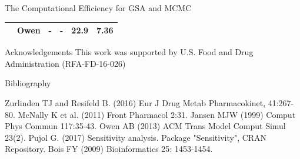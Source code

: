 \documentclass[xcolor=table]{beamer}
\begin{document}
\begin{frame}[t]
\begin{columns}[t]
\begin{column}{0.22\paperwidth}
\begin{block}{The Computational Efficiency for GSA and MCMC}
\begin{table}
\begin{adjustbox}{max width=\textwidth}
\begin{threeparttable}
\begin{tabular}{llcccc}
	    & Owen & - & - & 22.9 & 7.36 \\
    \hline   
  \end{tabular}
   \end{threeparttable} 
   \end{adjustbox}
\end{table}
\end{block}
%
\begin{block}{Acknowledgements}
\small This work was supported by U.S. Food and Drug Administration (RFA-FD-16-026) \\
\end{block}
%
\begin{alertblock}{Bibliography}
\begin{thebibliography}{9}
{\footnotesize {}
Zurlinden TJ and Resifeld B. (2016) Eur J Drug Metab Pharmacokinet, 41:267-80.}
{\footnotesize {}
McNally K et al. (2011) Front Pharmacol 2:31.}
{\footnotesize {}
Jansen MJW (1999) Comput Phys Commun 117:35-43.}
{\footnotesize {}
Owen AB (2013) ACM Trans Model Comput Simul 23(2).}
{\footnotesize {}
Pujol G. (2017) Sensitivity analysis. Package "Sensitivity", CRAN Repository.}
{\footnotesize {}
Bois FY (2009) Bioinformatics 25: 1453-1454.}
\end{thebibliography}
\end{alertblock}


\end{column} %

\end{columns} %

\end{frame} %
\end{document}
